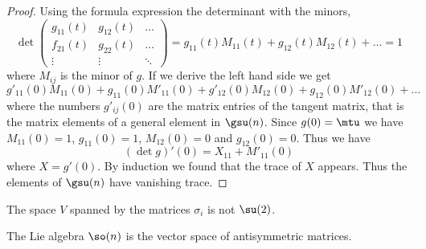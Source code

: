 \begin{proof}
	Using the formula expression the determinant with the minors,
	\begin{equation}
		\det\begin{pmatrix}
			g_{11}(t) & g_{12}(t) & \ldots \\
			f_{21}(t) & g_{22}(t) & \ldots \\
			\vdots    & \vdots    & \ddots
		\end{pmatrix}=g_{11}(t)M_{11}(t)+g_{12}(t)M_{12}(t)+\ldots=1
	\end{equation}
	where \( M_{ij}\) is the minor of \( g\). If we derive the left hand side we get
	\begin{equation}
		g'_{11}(0)M_{11}(0)+g_{11}(0)M'_{11}(0)+g'_{12}(0)M_{12}(0)+g_{12}(0)M'_{12}(0)+\ldots
	\end{equation}
	where the numbers \( g'_{ij}(0)\) are the matrix entries of the tangent matrix, that is the matrix elements of a general element in \( \gsu(n)\). Since \( g(0)=\mtu\) we have \( M_{11}(0)=1\), \( g_{11}(0)=1\), \( M_{12}(0)=0\) and \( g_{12}(0)=0\). Thus we have
	\begin{equation}
		(\det g)'(0)=X_{11}+M'_{11}(0)
	\end{equation}
	where \( X=g'(0)\). By induction we found that the trace of \( X\) appears. Thus the elements of \( \gsu(n)\) have vanishing trace.
\end{proof}

\begin{normaltext}
	The space \( V\) spanned by the matrices \( \sigma_i\) is not \( \su(2)\).
\end{normaltext}

\begin{proposition}     \label{PROPooDNNEooMOdrkq}
	The Lie algebra \( \so(n)\) is the vector space of antisymmetric matrices.
\end{proposition}

